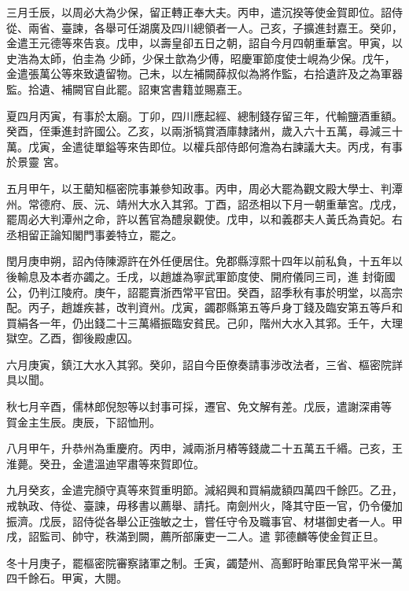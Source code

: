 \begin{pinyinscope}
 三月壬辰，以周必大為少保，留正轉正奉大夫。丙申，遣沉揆等使金賀即位。詔侍從、兩省、臺諫，各舉可任湖廣及四川總領者一人。己亥，子擴進封嘉王。癸卯，金遣王元德等來告哀。戊申，以壽皇卻五日之朝，詔自今月四朝重華宮。甲寅，以史浩為太師，伯圭為
 少師，少保土歆為少傅，昭慶軍節度使士峴為少保。戊午，金遣張萬公等來致遺留物。己未，以左補闕薛叔似為將作監，右拾遺許及之為軍器監。拾遺、補闕官自此罷。詔東宮書籍並賜嘉王。



 夏四月丙寅，有事於太廟。丁卯，四川應起經、總制錢存留三年，代輸鹽酒重額。癸酉，侄秉進封許國公。乙亥，以兩浙犒賞酒庫隸諸州，歲入六十五萬，尋減三十萬。戊寅，金遣徒單鎰等來告即位。以權兵部侍郎何澹為右諫議大夫。丙戌，有事於景靈
 宮。



 五月甲午，以王藺知樞密院事兼參知政事。丙申，周必大罷為觀文殿大學士、判潭州。常德府、辰、沅、靖州大水入其郛。丁酉，詔丞相以下月一朝重華宮。戊戌，罷周必大判潭州之命，許以舊官為醴泉觀使。戊申，以和義郡夫人黃氏為貴妃。右丞相留正論知閣門事姜特立，罷之。



 閏月庚申朔，詔內侍陳源許在外任便居住。免郡縣淳熙十四年以前私負，十五年以後輸息及本者亦蠲之。壬戌，以趙雄為寧武軍節度使、開府儀同三司，進
 封衛國公，仍判江陵府。庚午，詔罷賣浙西常平官田。癸酉，詔季秋有事於明堂，以高宗配。丙子，趙雄疾甚，改判資州。戊寅，蠲郡縣第五等戶身丁錢及臨安第五等戶和買絹各一年，仍出錢二十三萬緡振臨安貧民。己卯，階州大水入其郛。壬午，大理獄空。乙酉，御後殿慮囚。



 六月庚寅，鎮江大水入其郛。癸卯，詔自今臣僚奏請事涉改法者，三省、樞密院詳具以聞。



 秋七月辛酉，儒林郎倪恕等以封事可採，遷官、免文解有差。戊辰，遣謝深甫等
 賀金主生辰。庚辰，下詔恤刑。



 八月甲午，升恭州為重慶府。丙申，減兩浙月樁等錢歲二十五萬五千緡。己亥，王淮薨。癸丑，金遣溫迪罕肅等來賀即位。



 九月癸亥，金遣完顏守真等來賀重明節。減紹興和買絹歲額四萬四千餘匹。乙丑，戒執政、侍從、臺諫，毋移書以薦舉、請托。南劍州火，降其守臣一官，仍令優加振濟。戊辰，詔侍從各舉公正強敏之士，嘗任守令及職事官、材堪御史者一人。甲戌，詔監司、帥守，秩滿到闕，薦所部廉吏一二人。遣
 郭德麟等使金賀正旦。



 冬十月庚子，罷樞密院審察諸軍之制。壬寅，蠲楚州、高郵盱眙軍民負常平米一萬四千餘石。甲寅，大閱。




\end{pinyinscope}
